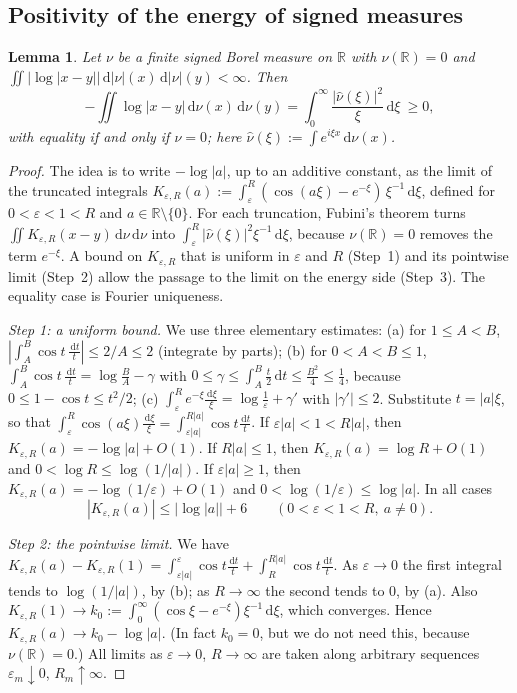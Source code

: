 \documentclass{amsart}
\newtheorem{lemma}[theorem]{Lemma}
\theoremstyle{definition}
\theoremstyle{remark}
\numberwithin{equation}{section}
\newcommand{\R}{\mathbb{R}}
\newcommand{\dd}{\,\mathrm{d}}
\begin{document}
\subsection{Positivity of the energy of signed measures}

\begin{lemma}\label{lem:positivity}
Let $\nu$ be a finite signed Borel measure on $\R$ with $\nu(\R)=0$ and
$\iint|\log|x-y||\dd|\nu|(x)\dd|\nu|(y)<\infty$. Then
\[
  -\iint\log|x-y|\dd\nu(x)\dd\nu(y)=\int_0^\infty\frac{|\hat\nu(\xi)|^2}{\xi}\dd\xi\ \ge0,
\]
with equality if and only if $\nu=0$; here $\hat\nu(\xi):=\int e^{i\xi x}\dd\nu(x)$.
\end{lemma}

\begin{proof}
The idea is to write $-\log|a|$, up to an additive constant, as the limit of the truncated integrals
$K_{\varepsilon,R}(a):=\int_\varepsilon^R(\cos(a\xi)-e^{-\xi})\,\xi^{-1}\dd\xi$, defined for $0<\varepsilon<1<R$ and
$a\in\R\setminus\{0\}$. For each truncation, Fubini's theorem turns $\iint K_{\varepsilon,R}(x-y)\dd\nu\dd\nu$ into
$\int_\varepsilon^R|\hat\nu(\xi)|^2\xi^{-1}\dd\xi$, because $\nu(\R)=0$ removes the term $e^{-\xi}$. A bound on
$K_{\varepsilon,R}$ that is uniform in $\varepsilon$ and $R$ (Step~1) and its pointwise limit (Step~2) allow the
passage to the limit on the energy side (Step~3). The equality case is Fourier uniqueness.

\emph{Step 1: a uniform bound.} We use three elementary estimates: (a) for $1\le A<B$,
$|\int_A^B\cos t\,\frac{\dd t}{t}|\le2/A\le2$ (integrate by parts); (b) for $0<A<B\le1$,
$\int_A^B\cos t\,\frac{\dd t}{t}=\log\frac BA-\gamma$ with $0\le\gamma\le\int_A^B\frac t2\dd t\le\frac{B^2}{4}\le\frac14$,
because $0\le1-\cos t\le t^2/2$;
(c) $\int_\varepsilon^Re^{-\xi}\frac{\dd\xi}{\xi}=\log\frac1\varepsilon+\gamma'$ with $|\gamma'|\le2$. Substitute
$t=|a|\xi$, so that $\int_\varepsilon^R\cos(a\xi)\frac{\dd\xi}{\xi}=\int_{\varepsilon|a|}^{R|a|}\cos t\frac{\dd t}{t}$.
If $\varepsilon|a|<1<R|a|$, then $K_{\varepsilon,R}(a)=-\log|a|+O(1)$. If $R|a|\le1$, then
$K_{\varepsilon,R}(a)=\log R+O(1)$ and $0<\log R\le\log(1/|a|)$. If $\varepsilon|a|\ge1$, then
$K_{\varepsilon,R}(a)=-\log(1/\varepsilon)+O(1)$ and $0<\log(1/\varepsilon)\le\log|a|$. In all cases
\begin{equation}\label{eq:Kbound}
  |K_{\varepsilon,R}(a)|\le\bigl|\log|a|\bigr|+6\qquad(0<\varepsilon<1<R,\ a\ne0).
\end{equation}

\emph{Step 2: the pointwise limit.} We have
$K_{\varepsilon,R}(a)-K_{\varepsilon,R}(1)=\int_{\varepsilon|a|}^{\varepsilon}\cos t\frac{\dd t}{t}+\int_R^{R|a|}\cos
t\frac{\dd t}{t}$. As $\varepsilon\to0$ the first integral tends to $\log(1/|a|)$, by (b); as $R\to\infty$ the second
tends to $0$, by (a). Also $K_{\varepsilon,R}(1)\to k_0:=\int_0^\infty(\cos\xi-e^{-\xi})\xi^{-1}\dd\xi$, which
converges. Hence $K_{\varepsilon,R}(a)\to k_0-\log|a|$. (In fact $k_0=0$, but we do not need this, because
$\nu(\R)=0$.) All limits as $\varepsilon\to0$, $R\to\infty$ are taken along arbitrary sequences
$\varepsilon_m\downarrow0$, $R_m\uparrow\infty$.


\end{proof}
\end{document}
